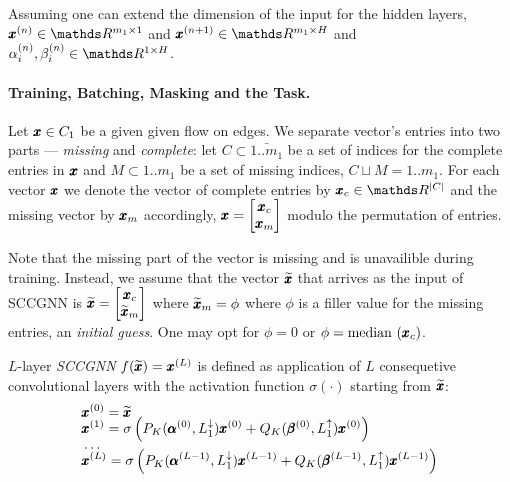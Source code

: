 \documentclass{mynotes}
\begin{document}
Assuming one can extend the dimension of the input for the hidden layers, \( \b x^{(n)} \in \ds R^{m_1 \times 1}\) and \( \b x^{(n+1)} \in \ds R^{m_1 \times H} \) and \( \alpha_i^{(n)}, \beta_i^{(n)} \in \ds R^{ 1 \times H } \).


\paragraph{ Training, Batching, Masking and the Task. }

Let \( \pmb{x} \in C_1 \) be a given given flow on edges. We separate vector's entries into two parts --- \emph{missing} and \emph{complete}: let \( C \subset \bar{1..m_1} \) be a set of indices for the complete entries in \( \pmb{x} \) and \( M \subset 1..m_1\) be a set of missing indices, \( C \sqcup M = 1..m_1\). For each vector \( \pmb{x} \) we denote the vector of complete entries by \( \b x_c \in \ds R^{| C | }\) and the missing vector by \(\pmb{x}_m \) accordingly, \( \pmb{x} = \begin{bmatrix} \pmb{x}_c \\ \pmb{x}_m \end{bmatrix} \) modulo the permutation of entries.

Note that the missing part of the vector is missing and is unavailible during training. Instead, we assume that the vector \( \widetilde{\pmb{x}} \) that arrives as the input of SCCGNN is \( \widetilde{\pmb{x}} = \begin{bmatrix} \pmb{x}_c \\ \widetilde{\pmb{x}}_m \end{bmatrix} \) where \( \widetilde{\pmb{x}}_m = \phi \) where \( \phi \) is a filler value for the missing entries, an \emph{initial guess}. One may opt for  \( \phi = 0 \) or \( \phi = \mathrm{median}\, \left(  \pmb{x}_c \right) \).

\begin{definition}[SCCGNN]
      \(L\)-layer \emph{SCCGNN} \( f(\widetilde{\pmb{x}}) = \pmb{x}^{(L)}\) is defined as application of \( L \) consequetive convolutional layers with the activation function \( \sigma(\cdot )\) starting from \( \widetilde{\pmb{x}}\):
      \begin{equation}
            \begin{aligned}
                  & \pmb{x}^{(0)} = \widetilde{\pmb{x}} \\[-0.5\baselineskip]
                  & \pmb{x}^{(1)} = \sigma \left( P_K( \pmb{\alpha}^{(0)}, L_{1}^{\downarrow}) \pmb{x}^{(0)} + Q_K( \pmb{\beta}^{(0)}, L_{1}^{\uparrow}) \pmb{x}^{(0)}  \right)  \\[-0.5\baselineskip]
                  & \ldots \\[-0.5\baselineskip]
                  & \pmb{x}^{(L)} = \sigma \left( P_K( \pmb{\alpha}^{(L-1)}, L_{1}^{\downarrow}) \pmb{x}^{(L-1)} + Q_K( \pmb{\beta}^{(L-1)}, L_{1}^{\uparrow}) \pmb{x}^{(L-1)}  \right) 
            \end{aligned}
      \end{equation}
\end{definition}
\end{document}
